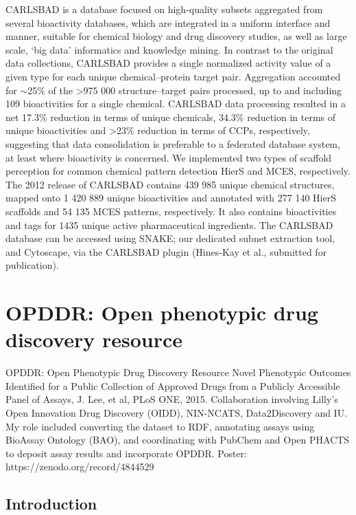 CARLSBAD is a database focused on high-quality subsets aggregated from several bioactivity databases, which are integrated in a uniform interface and manner, suitable for chemical biology and drug discovery studies, as well as large scale, ‘big data’ informatics and knowledge mining. In contrast to the original data collections, CARLSBAD provides a single normalized activity value of a given type for each unique chemical–protein target pair. Aggregation accounted for $\sim$25\% of the >975 000 structure–target pairs processed, up to and including 109 bioactivities for a single chemical. CARLSBAD data processing resulted in a net 17.3\% reduction in terms of unique chemicals, 34.3\% reduction in terms of unique bioactivities and >23\% reduction in terms of CCPs, respectively, suggesting that data consolidation is preferable to a federated database system, at least where bioactivity is concerned. We implemented two types of scaffold perception for common chemical pattern detection HierS and MCES, respectively. The 2012 release of CARLSBAD contains 439 985 unique chemical structures, mapped onto 1 420 889 unique bioactivities and annotated with 277 140 HierS scaffolds and 54 135 MCES patterns, respectively. It also contains bioactivities and tags for 1435 unique active pharmaceutical ingredients. The CARLSBAD database can be accessed using SNAKE; our dedicated subnet extraction tool, and Cytoscape, via the CARLSBAD plugin (Hines-Kay et al., submitted for publication).




\section{OPDDR: Open phenotypic drug discovery resource}

OPDDR: Open Phenotypic Drug Discovery Resource
Novel Phenotypic Outcomes Identified for a Public Collection of Approved Drugs from a Publicly Accessible Panel of Assays, J. Lee, et al, PLoS ONE, 2015.
Collaboration involving Lilly's Open Innovation Drug Discovery (OIDD), NIN-NCATS, Data2Discovery and IU.  
My role included converting the dataset to RDF,  annotating assays using BioAssay Ontology (BAO), and coordinating with PubChem and Open PHACTS to deposit assay results and incorporate OPDDR.
Poster: https://zenodo.org/record/4844529

\subsection{Introduction}

